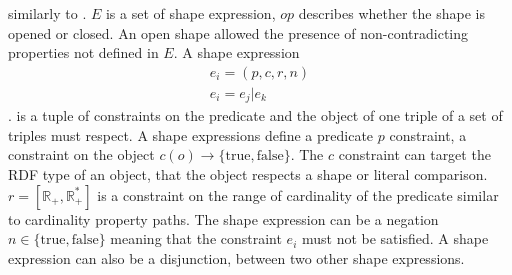 similarly to \citeauthor{Abbas2018}.
$E$ is a set of shape expression, $op$ describes whether the shape is opened or closed.
An open shape allowed the presence of non-contradicting properties not defined in $E$.
A shape expression 
\begin{align}
    e_i = (p, c, r, n) \\
    e_i = e_j|e_k
\end{align}
.
is a tuple of constraints on the predicate and the object of one triple of a set of triples must respect. 
A shape expressions define a predicate $p$ constraint,
a constraint on the object $c(o) \rightarrow \{\mathrm{true}, \mathrm{false}\}$.
The $c$ constraint can target the RDF type of an object, that the object respects a shape or literal comparison.
$r = [\mathbb{R}_+, \mathbb{R}_+^*]$ is a constraint on the range of cardinality of the predicate similar to cardinality property paths.
The shape expression can be a negation $n \in \{\mathrm{true}, \mathrm{false}\}$ meaning that the constraint $e_i$ must not be satisfied.
A shape expression can also be a disjunction, between two other shape expressions.

